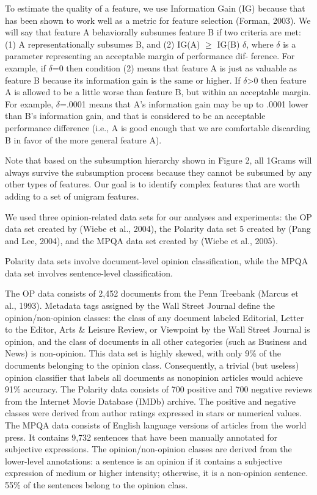 To estimate the quality of a feature, we use Information Gain (IG)
because that has been shown to work well as a metric for feature
selection (Forman, 2003). We will say that feature A behaviorally
subsumes feature B if two criteria are met: (1) A representationally
subsumes B, and (2) IG(A) $\geq$ IG(B) $\delta$, where $\delta$ is a
parameter representing an acceptable margin of performance dif-
ference. For example, if $\delta$=0 then condition (2) means that
feature A is just as valuable as feature B because its information
gain is the same or higher. If $\delta$>0 then feature A is allowed to
be a little worse than feature B, but within an acceptable
margin. For example, $\delta$=.0001 means that A's information gain
may be up to .0001 lower than B's information gain, and that is
considered to be an acceptable performance difference (i.e., A is good
enough that we are comfortable discarding B in favor of the more
general feature A).

Note that based on the subsumption hierarchy shown in Figure 2, all
1Grams will always survive the subsumption process because they
cannot be subsumed by any other types of features. Our goal is to
identify complex features that are worth adding to a set of unigram
features.

We used three opinion-related data sets for our analyses and
experiments: the OP data set created by (Wiebe et al., 2004), the
Polarity data set 5 created by (Pang and Lee, 2004), and the MPQA data
set created by (Wiebe et al., 2005).

Polarity data sets involve document-level opinion classification,
while the MPQA data set involves sentence-level classification.

The OP data consists of 2,452 documents from the Penn Treebank (Marcus
et al., 1993). Metadata tags assigned by the Wall Street Journal
define the opinion/non-opinion classes: the class of any document
labeled Editorial, Letter to the Editor, Arts \& Leisure Review, or
Viewpoint by the Wall Street Journal is opinion, and the class of
documents in all other categories (such as Business and News) is
non-opinion. This data set is highly skewed, with only 9\% of the
documents belonging to the opinion class. Consequently, a trivial (but
useless) opinion classifier that labels all documents as nonopinion
articles would achieve 91\% accuracy.  The Polarity data consists of
700 positive and 700 negative reviews from the Internet Movie Database
(IMDb) archive. The positive and negative classes were derived from
author ratings expressed in stars or numerical values. The MPQA data
consists of English language versions of articles from the world
press. It contains 9,732 sentences that have been manually annotated
for subjective expressions. The opinion/non-opinion classes are
derived from the lower-level annotations: a sentence is an opinion
if it contains a subjective expression of medium or higher
intensity; otherwise, it is a non-opinion sentence. 55\% of the
sentences belong to the opinion class.

